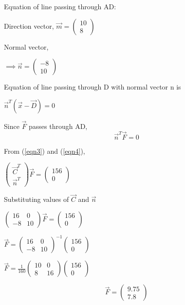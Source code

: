 \documentclass[letterpaper,12pt]{article}
\begin{document}
Equation of line passing through AD:
\begin{center}
    Direction vector, $\Vec{m} = \begin{pmatrix} 10 \\ 8 \end{pmatrix}$
\end{center}
Normal vector,
\begin{center}
    $\implies \Vec{n} = \begin{pmatrix} -8 \\ 10 \end{pmatrix}$
\end{center}
Equation of line passing through D with normal vector n is
\begin{center}
    $\Vec{n}^T(\Vec{x} - \Vec{D}) = 0$
\end{center}
Since $\Vec{F}$ passes through AD,
\begin{equation}
    \Vec{n}^T\Vec{F} = 0
\label{eqn4}
\end{equation}

From (\ref*{eqn3}) and (\ref*{eqn4}),
\begin{center}
    $\begin{pmatrix}\Vec{C}^T \\ \Vec{n}^T \end{pmatrix}\Vec{F} = \begin{pmatrix} 156 \\ 0 \end{pmatrix}$
\end{center}
Substituting values of $\Vec{C}$ and $\Vec{n}$
\begin{center}
    $\begin{pmatrix}16 & 0 \\ -8 & 10 \end{pmatrix}\Vec{F} = \begin{pmatrix} 156 \\ 0 \end{pmatrix}$
\end{center}
\begin{center}
    $\Vec{F} = \begin{pmatrix}16 & 0 \\ -8 & 10 \end{pmatrix}^{-1}\begin{pmatrix} 156 \\ 0 \end{pmatrix}$
\end{center}
\begin{center}
    $\Vec{F} = \frac{1}{160}\begin{pmatrix}10 & 0 \\ 8 & 16 \end{pmatrix}\begin{pmatrix} 156 \\ 0 \end{pmatrix}$
\end{center}
\begin{equation}
    \Vec{F} = \begin{pmatrix}9.75 \\ 7.8\end{pmatrix}
\end{equation}
\end{document}
